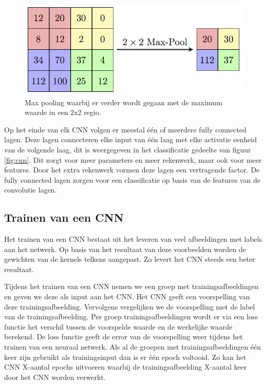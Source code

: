 \begin{figure}[!ht]
	\centering
	\includegraphics[width=0.5\linewidth]{fig/Maxpool.png}
	\caption{Max pooling waarbij er verder wordt gegaan met de maximum waarde in een 2x2 regio.}
	\label{fig:maxpool}
\end{figure}

Op het einde van elk CNN volgen er meestal \'e\'en of meerdere fully connected lagen. 
Deze lagen connecteren elke input van \'e\'en laag met elke activatie eenheid van de volgende laag, dit is weergegeven in het classificatie gedeelte van figuur \ref{fig:cnn}. 
Dit zorgt voor meer parameters en meer rekenwerk, maar ook voor meer features.
Door het extra rekenwerk vormen deze lagen een vertragende factor. 
De fully connected lagen zorgen voor een classificatie op basis van de features van de convolutie lagen.

\subsection{Trainen van een CNN} \label{train}
Het trainen van een CNN bestaat uit het leveren van veel afbeeldingen met labels aan het netwerk. 
Op basis van het resultaat van deze voorbeelden worden de gewichten van de kernels telkens aangepast.
Zo levert het CNN steeds een beter resultaat. 

Tijdens het trainen van een CNN nemen we een groep met trainingsafbeeldingen en geven we deze als input aan het CNN.
Het CNN geeft een voorspelling van deze trainingsafbeelding.
Vervolgens vergelijken we de voorspelling met de label van de trainingsafbeelding.
Per groep trainingsafbeeldingen wordt er via een loss functie het verschil tussen de voorspelde waarde en de werkelijke waarde berekend.
De loss functie geeft de error van de voorspelling weer tijdens het trainen van een neuraal netwerk. 
Als al de groepen met trainingsafbeeldingen \'e\'en keer zijn gebruikt als trainingsinput dan is er \'e\'en epoch voltooid.
Zo kan het CNN X-aantal epochs uitvoeren waarbij de trainingsafbeelding X-aantal keer door het CNN worden verwerkt.

